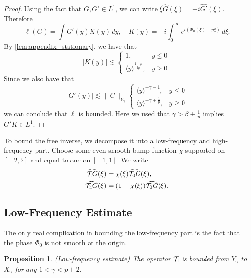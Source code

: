 \documentclass[11pt]{amsart}
\newtheorem{proposition}[theorem]{Proposition}
\theoremstyle{definition}
\theoremstyle{remark}
\numberwithin{equation}{section}
\newcommand{\mc}[1]{\mathcal{#1}}
\newcommand{\ang}[1]{\langle #1 \rangle}
\begin{document}
\begin{proof}
    Using the fact that $G,G' \in L^1$, we can write $\xi \widehat{G}(\xi) = -i\widehat{G'}(\xi)$. Therefore
    \[\ell(G) = \int G'(y)K(y) \, dy, \quad K(y) = -i\int_{0}^{\infty} e^{i(\Phi_0(\xi) - y\xi)}\,d\xi.\]
    By \cref{lem:appendix_stationary}, we have that
    \[|K(y)| \lesssim \begin{cases}
        1, & y \leq 0 \\
        \ang{y}^{\frac{1 - p}{2p}}, & y \geq 0.
    \end{cases}\]
    Since we also have that
    \[|G'(y)| \lesssim \|G\|_{Y_\gamma}\begin{cases}
        \ang{y}^{-\gamma - 1}, & y \leq 0 \\
        \ang{y}^{- \gamma + \frac{1}{p}}, & y \geq 0
    \end{cases}\]
    we can conclude that $\ell$ is bounded. Here we used that $\gamma > \beta + \frac{1}{p}$ implies $G'K \in L^1$.
\end{proof}



To bound the free inverse, we decompose it into a low-frequency and high-frequency part. Choose some even smooth bump function $\chi$ supported on $[-2,2]$ and equal to one on $[-1,1]$. We write 
\begin{equation}\label{eqn:linear_frequency_split}
\begin{aligned}
    \widehat{\mc{T}_{\textup{l}}G}(\xi) &= \chi(\xi) \widehat{\mc{T}_{0}G}(\xi),\\
    \widehat{\mc{T}_{\textup{h}}G}(\xi) &= (1 - \chi(\xi)) \widehat{\mc{T}_{0}G}(\xi).
\end{aligned}
\end{equation}

\subsection{Low-Frequency Estimate}\label{sec:linear_low_frequency}

The only real complication in bounding the low-frequency part is the fact that the phase $\Phi_0$ is not smooth at the origin. 

\begin{proposition}\label{prop:linear_low_frequency}(Low-frequency estimate)
    The operator $\mc{T}_{\textup{l}}$ is bounded from $Y_\gamma$ to $X_\gamma$ for any $1 < \gamma < p + 2$.
\end{proposition}
\end{document}

